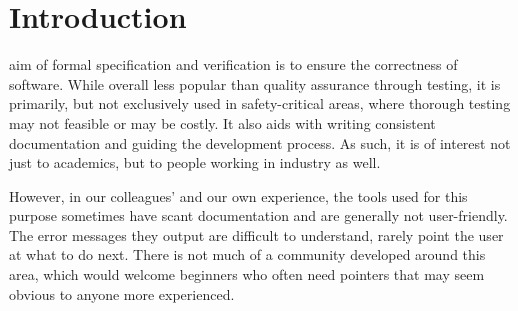 \documentclass[12pt,journal,duplex]{IEEEtran}
\begin{document}

	\maketitle


	\IEEEdisplaynotcompsoctitleabstractindextext


	\IEEEpeerreviewmaketitle
	\clearpage
	\tableofcontents
	\clearpage
	\twocolumn
	\section{Introduction}
	 aim of formal specification and verification is to ensure the correctness of software. While overall less popular than quality assurance through testing, it is primarily, but not exclusively used in safety-critical areas, where thorough testing may not feasible or may be costly. It also aids with writing consistent documentation and guiding the development process. As such, it is of interest not just to academics, but to people working in industry as well.

	However, in our colleagues' and our own experience, the tools used for this purpose sometimes have scant documentation and are generally not user-friendly. The error messages they output are difficult to understand, rarely point the user at what to do next. There is not much of a community developed around this area, which would welcome beginners who often need pointers that may seem obvious to anyone more experienced.
\end{document}
